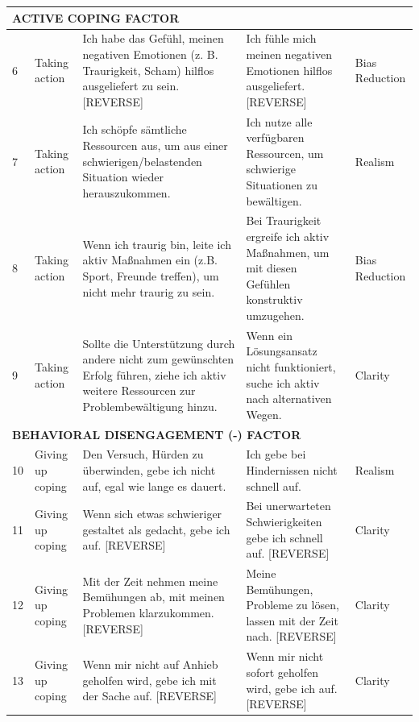 \documentclass[12pt,a4paper]{article}
\begin{document}
\begin{longtable}{p{}p{}p{}p{}p{}}
\midrule
\multicolumn{5}{l}{\textbf{ACTIVE COPING FACTOR}} \\
\midrule

6 & Taking action & Ich habe das Gefühl, meinen negativen Emotionen (z. B. Traurigkeit, Scham) hilflos ausgeliefert zu sein. [REVERSE] & Ich fühle mich meinen negativen Emotionen hilflos ausgeliefert. [REVERSE] & Bias Reduction \\

7 & Taking action & Ich schöpfe sämtliche Ressourcen aus, um aus einer schwierigen/belastenden Situation wieder herauszukommen. & Ich nutze alle verfügbaren Ressourcen, um schwierige Situationen zu bewältigen. & Realism \\

8 & Taking action & Wenn ich traurig bin, leite ich aktiv Maßnahmen ein (z.B. Sport, Freunde treffen), um nicht mehr traurig zu sein. & Bei Traurigkeit ergreife ich aktiv Maßnahmen, um mit diesen Gefühlen konstruktiv umzugehen. & Bias Reduction \\

9 & Taking action & Sollte die Unterstützung durch andere nicht zum gewünschten Erfolg führen, ziehe ich aktiv weitere Ressourcen zur Problembewältigung hinzu. & Wenn ein Lösungsansatz nicht funktioniert, suche ich aktiv nach alternativen Wegen. & Clarity \\

\midrule
\multicolumn{5}{l}{\textbf{BEHAVIORAL DISENGAGEMENT (-) FACTOR}} \\
\midrule

10 & Giving up coping & Den Versuch, Hürden zu überwinden, gebe ich nicht auf, egal wie lange es dauert. & Ich gebe bei Hindernissen nicht schnell auf. & Realism \\

11 & Giving up coping & Wenn sich etwas schwieriger gestaltet als gedacht, gebe ich auf. [REVERSE] & Bei unerwarteten Schwierigkeiten gebe ich schnell auf. [REVERSE] & Clarity \\

12 & Giving up coping & Mit der Zeit nehmen meine Bemühungen ab, mit meinen Problemen klarzukommen. [REVERSE] & Meine Bemühungen, Probleme zu lösen, lassen mit der Zeit nach. [REVERSE] & Clarity \\

13 & Giving up coping & Wenn mir nicht auf Anhieb geholfen wird, gebe ich mit der Sache auf. [REVERSE] & Wenn mir nicht sofort geholfen wird, gebe ich auf. [REVERSE] & Clarity \\


\end{longtable}
\end{document}
